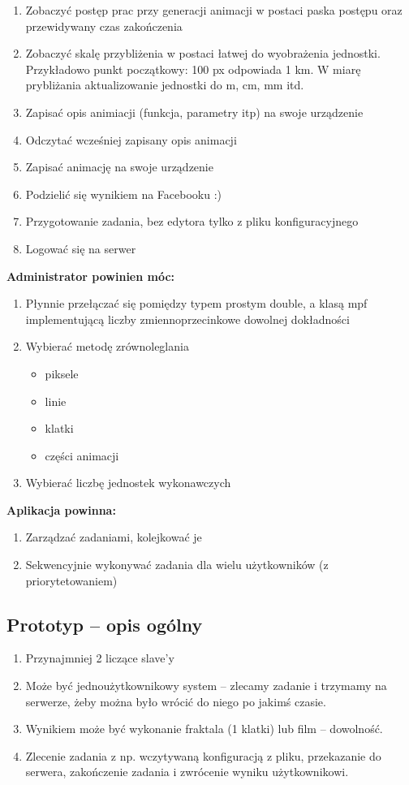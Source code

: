 \documentclass[a4paper]{article}
\begin{document}
\begin{enumerate}
\item Zobaczyć postęp prac przy generacji animacji w postaci paska postępu oraz przewidywany czas zakończenia 
\item Zobaczyć skalę przybliżenia w postaci łatwej do wyobrażenia jednostki. Przykładowo punkt początkowy: 100 px odpowiada 1 km. W miarę prybliżania aktualizowanie jednostki do m, cm, mm itd.
\item Zapisać opis animiacji (funkcja, parametry itp) na swoje urządzenie
\item Odczytać wcześniej zapisany opis animacji
\item Zapisać animację na swoje urządzenie
\item Podzielić się wynikiem na Facebooku :)
\item Przygotowanie zadania, bez edytora tylko z pliku konfiguracyjnego
\item Logować się na serwer
\end{enumerate}
\textbf{Administrator powinien móc:}
\begin{enumerate}
\item Płynnie przełączać się pomiędzy typem prostym double, a klasą mpf implementującą liczby zmiennoprzecinkowe dowolnej dokładności
\item Wybierać metodę zrównoleglania 
\begin{itemize}
\item piksele
\item linie
\item klatki
\item części animacji
\end{itemize}
\item Wybierać liczbę jednostek wykonawczych
\end{enumerate}
\textbf{Aplikacja powinna:}
\begin{enumerate}
\item Zarządzać zadaniami, kolejkować je
\item Sekwencyjnie wykonywać zadania dla wielu użytkowników (z priorytetowaniem)
\end{enumerate}
\subsection{Prototyp -- opis ogólny}
\begin{enumerate}
\item Przynajmniej 2 liczące slave'y
\item Może być jednoużytkownikowy system -- zlecamy zadanie i trzymamy na serwerze, żeby można było wrócić do niego po jakimś czasie.
\item Wynikiem może być wykonanie fraktala (1 klatki) lub film -- dowolność.
\item Zlecenie zadania z np. wczytywaną konfiguracją z pliku, przekazanie do serwera, zakończenie zadania i zwrócenie wyniku użytkownikowi.
\end{enumerate}
\end{document}
